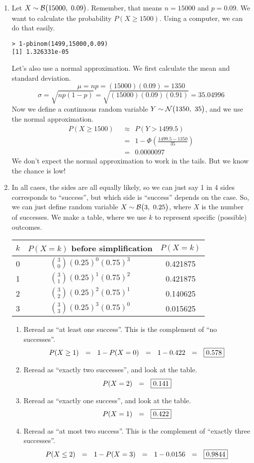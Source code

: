 \documentclass[12pt,letterpaper]{article}
\begin{document}
\begin{enumerate}
\item Let $X\sim \mathcal{B}\big(15000,~0.09\big)$. Remember, that means $n=15000$ and $p=0.09$. We want to calculate the probability $P(X \ge 1500)$. Using a computer, we can do that easily.
\begin{verbatim}
> 1-pbinom(1499,15000,0.09)
[1] 1.326331e-05
\end{verbatim}
Let's also use a normal approximation. We first calculate the mean and standard deviation.
$$\mu = np = (15000)(0.09) = 1350 $$
$$\sigma = \sqrt{np(1-p)} = \sqrt{(15000)(0.09)(0.91)} = 35.04996 $$
Now we define a continuous random variable $Y\sim \mathcal{N}\big(1350,~35\big)$, and we use the normal approximation.
\begin{align*}
P(X \ge 1500) ~~&\approx~~ P(Y > 1499.5)\\
 &=~~ 1-\Phi\left(\frac{1499.5-1350}{35} \right)\\
 &=~~ 0.0000097
\end{align*}
We don't expect the normal approximation to work in the tails. But we know the chance is low!



\item In all cases, the sides are all equally likely, so we can just say 1 in 4 sides corresponds to ``success'', but which side is ``success'' depends on the case. So, we can just define random variable $X\sim\mathcal{B}\big(3,~0.25\big)$, where $X$ is the number of successes. We make a table, where we use $k$ to represent specific (possible) outcomes.
\begin{center}
\renewcommand{\arraystretch}{1.5}
\begin{tabular}{|c|c|c|}\hline
$k$ & $P(X=k)$ before simplification & $P(X=k)$ \\ \hline
0  & ${3\choose 0} (0.25)^{0} (0.75)^3$ &  0.421875 \\
1  & ${3\choose 1} (0.25)^{1} (0.75)^2$ & 0.421875 \\
2  & ${3\choose 2} (0.25)^{2} (0.75)^1$ &  0.140625 \\
3  & ${3\choose 3} (0.25)^{3} (0.75)^0$ &  0.015625 \\ \hline
\end{tabular}
\end{center}
\begin{enumerate}
\item Reread as ``at least one success''. This is the complement of ``no successes''.
$$P(X\ge 1) ~~=~~ 1-P(X=0) ~~=~~ 1-0.422 ~~=~~ \fbox{0.578}$$
\item Reread as ``exactly two successes'', and look at the table.
$$P(X = 2) ~~=~~ \fbox{0.141}$$
\item Reread as ``exactly one success'', and look at the table.
$$P(X = 1) ~~=~~ \fbox{0.422}$$
\item Reread as ``at most two success''. This is the complement of ``exactly three successes''.
$$P(X \le 2) ~~=~~ 1 - P(X=3) ~~=~~ 1-0.0156 ~~=~~ \fbox{0.9844} $$


\end{enumerate}
\end{enumerate}
\end{document}
